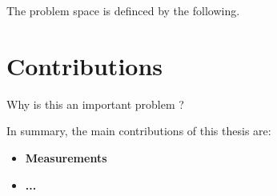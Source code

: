 The problem space is definced by the following.

\section{Contributions}
\label{sec:intro:contrib}


Why is this an important problem ?
%

In summary, the main contributions of this thesis are:

\begin{itemize}
    \item \bf Measurements
    
    \item \bf ...
    
\end{itemize}

